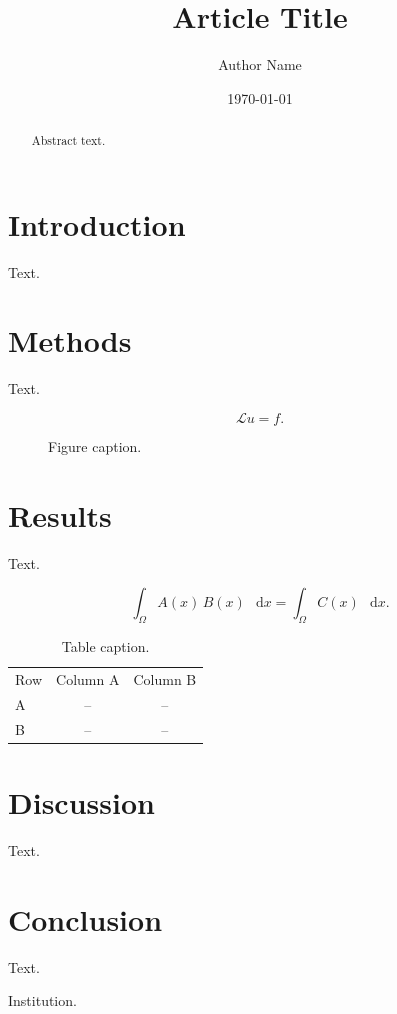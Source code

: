 \documentclass[aps,twocolumn,10pt,superscriptaddress,nofootinbib,longbibliography]{revtex4-2}
\providecommand{\dd}{\mathop{}\!\mathrm{d}}
\theoremstyle{definition}
\theoremstyle{remark}
\begin{document}
\title{Article Title}

\author{Author Name}

\date{\today}

\begin{abstract}
Abstract text.
\end{abstract}

\maketitle

\section{Introduction}

Text.

\section{Methods}

Text.

\begin{equation}
  \mathcal{L}u = f .
  \label{eq:example}
\end{equation}

\begin{figure}[t]
  \centering
  \fbox{\rule{0pt}{1.35in}\rule{0.90\columnwidth}{0pt}}
  \caption{Figure caption.\label{fig:example}}
\end{figure}

\section{Results}

Text.

\begin{widetext}
\begin{equation}
  \int_{\Omega} A(x)\,B(x)\,\dd x
  =
  \int_{\Omega} C(x)\,\dd x .
  \label{eq:wide-example}
\end{equation}
\end{widetext}

\begin{table}[b]
  \caption{Table caption.\label{tab:example}}
  \begin{ruledtabular}
  \begin{tabular}{lcc}
  Row & Column A & Column B \\
  \colrule
  A & -- & -- \\
  B & -- & -- \\
  \end{tabular}
  \end{ruledtabular}
\end{table}

\section{Discussion}

Text.

\section{Conclusion}

Text.

\begin{acknowledgments}
Institution.
\end{acknowledgments}

\end{document}
